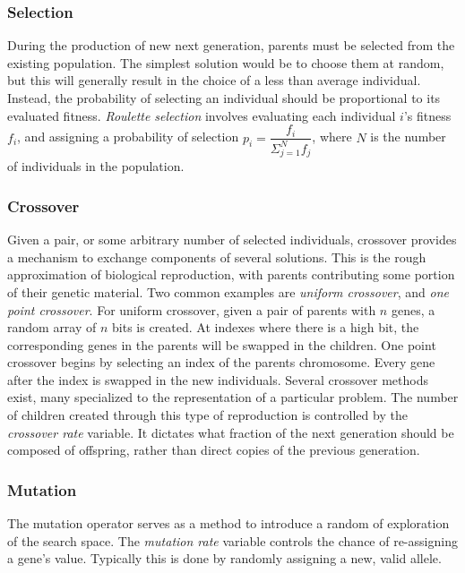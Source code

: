 \subsubsection{Selection}

During the production of new next generation, parents must be selected from the existing population. The simplest solution would be to choose them at random, but this will generally result in the choice of a less than average individual. Instead, the probability of selecting an individual should be proportional to its evaluated fitness. \textit{Roulette selection} involves evaluating each individual $i$'s fitness $f_i$, and assigning a probability of selection $p_i=\dfrac{f_i}{\Sigma_{j=1}^Nf_j}$, where $N$ is the number of individuals in the population.


\subsubsection{Crossover}

Given a pair, or some arbitrary number of selected individuals, crossover provides a mechanism to exchange components of several solutions. This is the rough approximation of biological reproduction, with parents contributing some portion of their genetic material. Two common examples are \textit{uniform crossover}, and \textit{one point crossover}. For uniform crossover, given a pair of parents with $n$ genes, a random array of $n$ bits is created. At indexes where there is a high bit, the corresponding genes in the parents will be swapped in the children. One point crossover begins by selecting an index of the parents chromosome. Every gene after the index is swapped in the new individuals. Several crossover methods exist, many specialized to the representation of a particular problem. The number of children created through this type of reproduction is controlled by the \textit{crossover rate} variable. It dictates what fraction of the next generation should be composed of offspring, rather than direct copies of the previous generation.



\subsubsection{Mutation}

The mutation operator serves as a method to introduce a random of exploration of the search space. The \textit{mutation rate} variable controls the chance of re-assigning a gene's value. Typically this is done by randomly assigning a new, valid allele.


